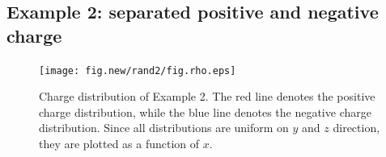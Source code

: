\documentclass[aps,pre,preprint,unsortedaddress]{revtex4}
\renewcommand{\v}[1]{\textbf{\textit{#1}}}
\begin{document}




\subsection{Example 2: separated positive and negative charge}
\label{sec:example2}

\begin{figure}
  \centering
  \texttt{[image: fig.new/rand2/fig.rho.eps]}
  \caption{Charge distribution of Example 2. The red line
    denotes the positive charge distribution, while the blue line
    denotes the negative charge distribution. Since all distributions
    are uniform on $y$ and $z$ direction, they are plotted as a
    function of $x$.}
  \label{fig:tmp-rho2}
\end{figure}
\end{document}
